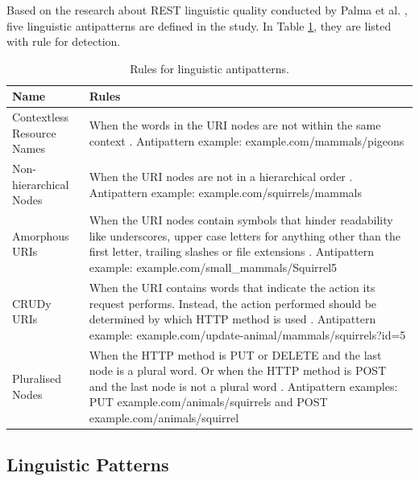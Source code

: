 Based on the research about REST linguistic quality conducted by Palma et al. \cite{linguistic}, five linguistic antipatterns are defined in the study. In Table \ref{tab:Rulesforlinguisticantipatterns}, they are listed with rule for detection.
\begin{center}
\begin{table}[!ht]
\small
\begin{tabular}{|p{30mm}|p{105mm}|}
\hline \textbf{Name} & \textbf{Rules} \\
\hline 
Contextless Resource Names &
When the words in the URI nodes are not within the same context \cite{linguistic}. \newline Antipattern example: example.com/mammals/pigeons\\ \hline
Non-hierarchical Nodes &
When the URI nodes are not in a hierarchical order \cite{linguistic}. \newline Antipattern example: example.com/squirrels/mammals\\ \hline
Amorphous URIs &
When the URI nodes contain symbols that hinder readability like underscores, upper case letters for anything other than the first letter, trailing slashes or file extensions \cite{linguistic}. \newline Antipattern example: 
example.com/small\_mammals/Squirrel5\\ \hline
CRUDy URIs &
When the URI contains words that indicate the action its request performs. Instead, the action performed should be determined by which HTTP method is used \cite{linguistic}. \newline Antipattern example: 
example.com/update-animal/mammals/squirrels?id=5\\ \hline
Pluralised Nodes
&
When the HTTP method is PUT or DELETE and the last node is a plural word. Or when the HTTP method is POST and the last node is not a plural word \cite{linguistic}. \newline Antipattern examples: PUT example.com/animals/squirrels and POST example.com/animals/squirrel

\\ \hline
\end{tabular}
 \caption{Rules for linguistic antipatterns.}
 \label{tab:Rulesforlinguisticantipatterns}
\end{table}
\end{center}

\clearpage

\subsection{Linguistic Patterns}

